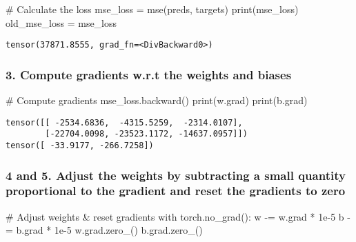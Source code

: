 \documentclass[
  letterpaper,
  DIV=11,
  numbers=noendperiod]{scrartcl}
\newenvironment{Shaded}{\begin{snugshade}}{\end{snugshade}}
\newcommand{\BuiltInTok}[1]{\textcolor[rgb]{0.00,0.23,0.31}{#1}}
\newcommand{\CommentTok}[1]{\textcolor[rgb]{0.37,0.37,0.37}{#1}}
\newcommand{\ControlFlowTok}[1]{\textcolor[rgb]{0.00,0.23,0.31}{#1}}
\newcommand{\FloatTok}[1]{\textcolor[rgb]{0.68,0.00,0.00}{#1}}
\newcommand{\NormalTok}[1]{\textcolor[rgb]{0.00,0.23,0.31}{#1}}
\newcommand{\OperatorTok}[1]{\textcolor[rgb]{0.37,0.37,0.37}{#1}}
\begin{document}
\begin{Shaded}
\begin{Highlighting}[]
\CommentTok{\# Calculate the loss}
\NormalTok{mse\_loss }\OperatorTok{=}\NormalTok{ mse(preds, targets)}
\BuiltInTok{print}\NormalTok{(mse\_loss)}
\NormalTok{old\_mse\_loss }\OperatorTok{=}\NormalTok{ mse\_loss}
\end{Highlighting}
\end{Shaded}

\begin{verbatim}
tensor(37871.8555, grad_fn=<DivBackward0>)
\end{verbatim}

\hypertarget{compute-gradients-w.r.t-the-weights-and-biases}{%
\subsubsection{3. Compute gradients w.r.t the weights and
biases}\label{compute-gradients-w.r.t-the-weights-and-biases}}

\begin{Shaded}
\begin{Highlighting}[]
\CommentTok{\# Compute gradients}
\NormalTok{mse\_loss.backward()}
\BuiltInTok{print}\NormalTok{(w.grad)}
\BuiltInTok{print}\NormalTok{(b.grad)}
\end{Highlighting}
\end{Shaded}

\begin{verbatim}
tensor([[ -2534.6836,  -4315.5259,  -2314.0107],
        [-22704.0098, -23523.1172, -14637.0957]])
tensor([ -33.9177, -266.7258])
\end{verbatim}

\hypertarget{and-5.-adjust-the-weights-by-subtracting-a-small-quantity-proportional-to-the-gradient-and-reset-the-gradients-to-zero}{%
\subsubsection{4 and 5. Adjust the weights by subtracting a small
quantity proportional to the gradient and reset the gradients to
zero}\label{and-5.-adjust-the-weights-by-subtracting-a-small-quantity-proportional-to-the-gradient-and-reset-the-gradients-to-zero}}

\begin{Shaded}
\begin{Highlighting}[]
\CommentTok{\# Adjust weights \& reset gradients}
\ControlFlowTok{with}\NormalTok{ torch.no\_grad():}
\NormalTok{    w }\OperatorTok{{-}=}\NormalTok{ w.grad }\OperatorTok{*} \FloatTok{1e{-}5}
\NormalTok{    b }\OperatorTok{{-}=}\NormalTok{ b.grad }\OperatorTok{*} \FloatTok{1e{-}5}
\NormalTok{    w.grad.zero\_()}
\NormalTok{    b.grad.zero\_()}
\end{Highlighting}
\end{Shaded}
\end{document}
